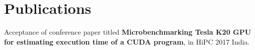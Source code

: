 \section{Publications}\label{sec:publications}
\startListPointOneInchAwayFromLeft
\vspace{4pt}
\item{Acceptance of conference paper titled \textbf{Microbenchmarking Tesla K20 GPU for estimating execution time of a CUDA program}, in HiPC 2017 India.}
\makeLinePointOneInchAwayEnd

